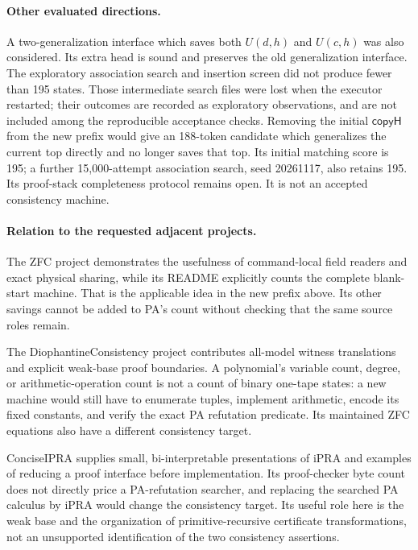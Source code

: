 \paragraph{Other evaluated directions.}
A two-generalization interface which saves both \(U(d,h)\) and
\(U(c,h)\) was also considered.  Its extra head is sound and preserves
the old generalization interface.  The exploratory association
search and insertion screen did not produce fewer than 195 states.
Those intermediate search files were lost when the executor
restarted; their outcomes are recorded as exploratory observations,
and are not included among the reproducible acceptance checks.
Removing the initial \(\mathsf{copyH}\) from the new prefix would
give an 188-token candidate which generalizes the current top
directly and no longer saves that top.  Its initial matching score
is 195; a further 15,000-attempt association search, seed 20261117,
also retains 195.  Its proof-stack completeness protocol remains open.
It is not an accepted consistency machine.

\paragraph{Relation to the requested adjacent projects.}
The ZFC project demonstrates the usefulness of command-local field
readers and exact physical sharing, while its README explicitly
counts the complete blank-start machine.  That is the applicable
idea in the new prefix above.  Its other savings cannot be added
to PA's count without checking that the same source roles remain.

The DiophantineConsistency project contributes all-model witness
translations and explicit weak-base proof boundaries.  A polynomial's
variable count, degree, or arithmetic-operation count is not a count
of binary one-tape states: a new machine would still have to enumerate
tuples, implement arithmetic, encode its fixed constants, and verify
the exact PA refutation predicate.  Its maintained ZFC equations
also have a different consistency target.

ConciseIPRA supplies small, bi-interpretable presentations of iPRA
and examples of reducing a proof interface before implementation.
Its proof-checker byte count does not directly price a PA-refutation
searcher, and replacing the searched PA calculus by iPRA would
change the consistency target.  Its useful role here is the weak
base and the organization of primitive-recursive certificate
transformations, not an unsupported identification of the two
consistency assertions.

